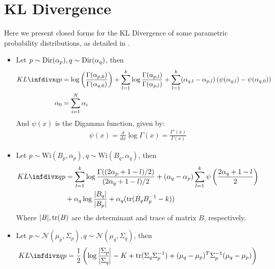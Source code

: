 \documentclass[../main.tex]{subfiles}
\begin{document}
 \label{app1}
\section{KL Divergence}
Here we present closed forms for the KL Divergence of some parametric probability distributions, as detailed in \cite{Rezek2005}.
\begin{itemize}
\item Let $p \sim \text{Dir}(\mathbf{\alpha}_p), q \sim \text{Dir}(\mathbf{\alpha}_q)$, then
\begin{align*}
KL\infdiv{q}{p} &= \log{\left(\frac{\Gamma(\alpha_{p,0})}{\Gamma(\alpha_{q,0})}\right)} + \sum_{l=1}^k\log{\frac{\Gamma(\V{\alpha}_{p, l})}{\Gamma(\V{\alpha}_{p, l})}} + \sum_{l=1}^k(\V{\alpha}_{q,l}-\V{\alpha}_{p,l})\left(\psi(\V{\alpha}_{q,l})-\psi(\alpha_{q,0})\right)\\
\alpha_0 &= \sum_{i=1}^N\V{\alpha}_i
\end{align*}
And $\psi(x)$ is the Digamma function, given by:
\begin{align*}
\psi(x) = \frac{d}{dx}\log{\Gamma(x)} = \frac{\Gamma'(x)}{\Gamma(x)}
\end{align*}
\item Let $p \sim \text{Wi}(B_p, \alpha_p), q \sim \text{Wi}(B_q, \alpha_q)$, then
\begin{align*}
KL\infdiv{q}{p} &= \sum_{l=1}^k\log{\frac{\Gamma((2\alpha_p + 1 - l)/2)}{(2\alpha_q + 1 - l)/2}}+(\alpha_q-\alpha_p)\sum_{l=1}^k\psi\left(\frac{2\alpha_q + 1 - l}{2}\right)\\&+\alpha_q\log{\frac{\abs{B_q}}{\abs{B_p}}} + \alpha_q(\text{tr}(B_qB_p^{-1}-k))
\end{align*}
Where $\lvert B\rvert, \text{tr}(B)$ are the determinant and trace of matrix $B$, respectively.
\item Let $p \sim \mathcal{N}(\mu_p, \Sigma_p), q \sim \mathcal{N}(\mu_q, \Sigma_q)$, then
\begin{align*}
KL\infdiv{q}{p}=\frac{1}{2}\left(\log{\frac{\abs{\Sigma_p}}{\abs{\Sigma_q}}}-K+\text{tr}(\Sigma_q\Sigma_p^{-1})+(\mu_q-\mu_p)^T\Sigma_p^{-1}(\mu_q-\mu_p)\right)
\end{align*}
\end{itemize}
\end{document}

